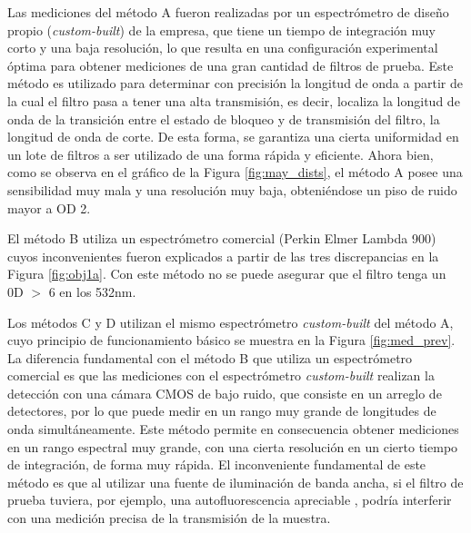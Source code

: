 Las mediciones del método A fueron realizadas por un espectrómetro de diseño 
propio (\textit{custom-built}) de la empresa,  que tiene un tiempo de 
integración muy corto y una baja resolución, lo que resulta en una 
configuración 
experimental óptima para obtener mediciones de una gran cantidad de filtros de 
prueba. Este método es utilizado para determinar con precisión la longitud de 
onda a partir de la cual el filtro pasa a tener una alta transmisión, es decir, 
localiza la longitud de onda de la transición entre el estado de bloqueo y de 
transmisión del filtro, la longitud de onda de corte. De esta forma, se 
garantiza una cierta uniformidad en un lote de filtros a ser utilizado de una 
forma rápida y eficiente. Ahora bien, como se observa en el gráfico de la 
Figura \ref{fig:may_dists}, el método A posee una sensibilidad muy mala y una 
resolución muy baja, obteniéndose un piso de ruido mayor a OD 2.

El método B utiliza un espectrómetro comercial (Perkin Elmer
Lambda 900) cuyos inconvenientes fueron explicados a partir de las tres 
discrepancias en la Figura \ref{fig:obj1a}. Con este método no se puede 
asegurar que el filtro tenga un 0D $>$ 6 en los 532nm.


Los métodos C y D utilizan el mismo espectrómetro \textit{custom-built}	del 
método A, cuyo principio de funcionamiento básico se muestra en la Figura 
\ref{fig:med_prev}. La diferencia fundamental con el método B que utiliza un 
espectrómetro comercial es que las mediciones con el espectrómetro 
\textit{custom-built} realizan la detección con una cámara CMOS de bajo ruido, 
que consiste en un arreglo de detectores, por lo que puede medir en un rango 
muy grande de longitudes de onda simultáneamente. Este método permite en 
consecuencia obtener mediciones en un rango espectral muy grande, con una 
cierta resolución en un cierto tiempo de integración, de forma muy rápida.
El inconveniente fundamental de este método es que al utilizar una fuente de 
iluminación de banda ancha, si el filtro de prueba tuviera, por ejemplo, una 
autofluorescencia apreciable \cite{Shah2017}, podría interferir con una 
medición precisa de la transmisión de la muestra.



